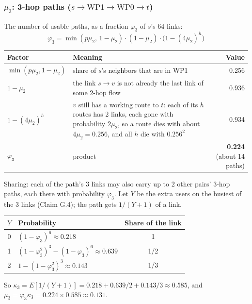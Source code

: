 \subsubsection*{$\mu_3$: 3-hop paths ($s \to \text{WP1} \to \text{WP0} \to t$)}

The number of usable paths, as a fraction $\varphi_3$ of $s$'s 64 links:
\[
\varphi_3 = \min(p \mu_2,\, 1 - \mu_2) \cdot (1 - \mu_2) \cdot \big(1 - (4 \mu_2)^h\big)
\]

\begin{center}
\begin{tabularx}{\linewidth}{@{}l L r@{}}
\toprule
Factor & Meaning & Value \\
\midrule
$\min(p\mu_2, 1 - \mu_2)$ & share of $s$'s neighbors that are in WP1 & 0.256 \\
$1 - \mu_2$ & the link $s \to v$ is not already the last link of some 2-hop flow & 0.936 \\
$1 - (4\mu_2)^h$ & $v$ still has a working route to $t$: each of its $h$ routes has 2 links, each gone with probability $2\mu_2$, so a route dies with about $4\mu_2 = 0.256$, and all $h$ die with $0.256^2$ & 0.934 \\
$\varphi_3$ & product & \textbf{0.224} (about 14 paths) \\
\bottomrule
\end{tabularx}
\end{center}

Sharing: each of the path's 3 links may also carry up to 2 other pairs' 3-hop paths, each there with probability $\varphi_3$. Let $Y$ be the extra users on the busiest of the 3 links (Claim G.4); the path gets $1/(Y+1)$ of a link.

\begin{center}
\begin{tabular}{@{}clc@{}}
\toprule
$Y$ & Probability & Share of the link \\
\midrule
0 & $(1 - \varphi_3)^6 \approx 0.218$ & 1 \\
1 & $(1 - \varphi_3^2)^3 - (1 - \varphi_3)^6 \approx 0.639$ & 1/2 \\
2 & $1 - (1 - \varphi_3^2)^3 \approx 0.143$ & 1/3 \\
\bottomrule
\end{tabular}
\end{center}

So $\kappa_3 = E[1/(Y+1)] = 0.218 + 0.639/2 + 0.143/3 \approx \mathbf{0.585}$, and $\mu_3 = \varphi_3 \kappa_3 = 0.224 \times 0.585 \approx \mathbf{0.131}$.

